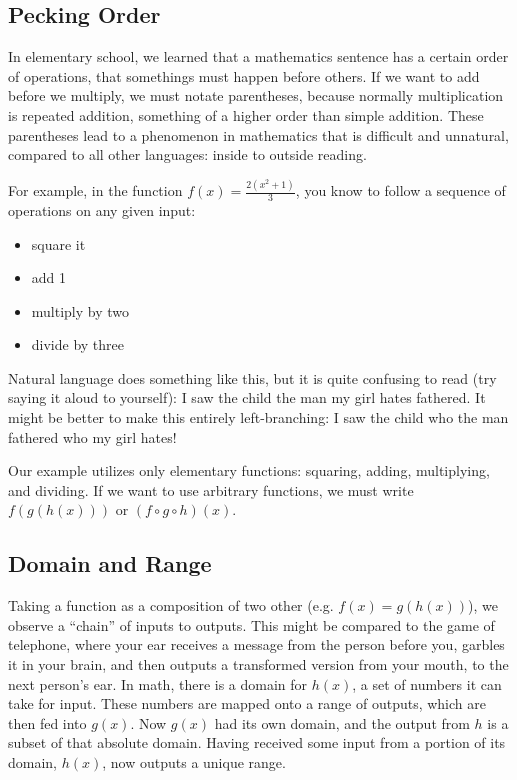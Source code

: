 
\subsection{Pecking Order}



In elementary school, we learned that a mathematics sentence has a 
certain order of operations, that somethings must happen before others.
If we want to add before we multiply, we must notate parentheses,
because normally multiplication is repeated addition, something of a higher
order than simple addition.  These parentheses lead to a phenomenon
in mathematics that is difficult and unnatural, compared to all other
languages: inside to outside reading.

For example, in the function $f(x)=\frac{2(x^2+1)}{3}$, you know to follow a
sequence of operations on any given input:
\begin{itemize}
\item square it
\item add 1
\item multiply by two
\item divide by three
\end{itemize}
Natural language does something like this, but it is quite confusing to read
(try saying it aloud to yourself): I saw the child the man my girl hates fathered.
It might be better to make this entirely left-branching: I saw the child who
the man fathered who my girl hates!

Our example utilizes only elementary functions: squaring, adding, multiplying,
and dividing.  If we want to use arbitrary functions, we must write
$f(g(h(x)))$ or $(f\circ g\circ h)(x)$.

\subsection{Domain and Range}
Taking a function as a composition of two other (e.g. $f(x)=g(h(x))$), we observe
a ``chain'' of inputs to outputs.  This might be compared to the game of telephone,
where your ear receives a message from the person before you, garbles it in your
brain, and then outputs a transformed version from your mouth, to the next person's
ear.  In math, there is a domain for $h(x)$, a set of numbers it can take for input.
These numbers are mapped onto a range of outputs, which are then fed into
$g(x)$.  Now $g(x)$ had its own domain, and the output from $h$ is a subset of that
absolute domain.  Having received some input from a portion of its domain,
$h(x)$, now outputs a unique range.

